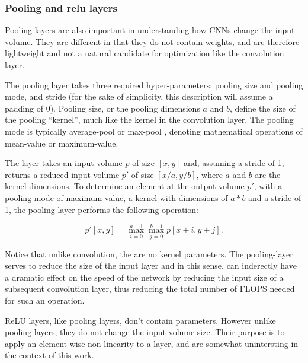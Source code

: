\subsubsection{Pooling and relu layers}
Pooling layers are also important in understanding how CNNs change the input volume. They are different in that they do not contain weights, and are therefore lightweight and not a natural candidate for optimization like the convolution layer.

The pooling layer takes three required hyper-parameters: pooling size and pooling mode, and stride (for the sake of simplicity, this description will assume a padding of 0). Pooling size, or the pooling dimensions $a$ and $b$, define the size of the pooling ``kernel'', much like the kernel in the convolution layer. The pooling mode is typically average-pool or max-pool \cite{convnets}, denoting mathematical operations of mean-value or maximum-value.

The layer takes an input volume $p$ of size $[x,y]$ and, assuming a stride of 1, returns a reduced input volume $p'$ of size $[x/a,y/b]$, where $a$ and $b$ are the kernel dimensions. To determine an element at the output volume $p'$, with a pooling mode of maximum-value, a kernel with dimensions of $a*b$ and a stride of 1, the pooling layer performs the following operation:

\begin{equation}
\label{eqn:pool}
p'[x,y] = \max_{i=0}^{a-1}\max_{j=0}^{b-1}{p[x+i,y+j]}.
\end{equation}

Notice that unlike convolution, the are no kernel parameters. The pooling-layer serves to reduce the size of the input layer and in this sense, can inderectly have a dramatic effect on the speed of the network by reducing the input size of a subsequent convolution layer, thus reducing the total number of FLOPS needed for such an operation.

ReLU layers, like pooling layers, don't contain parameters. However unlike pooling layers, they do not change the input volume size. Their purpose is to apply an element-wise non-linearity to a layer, and are somewhat unintersting in the context of this work.

